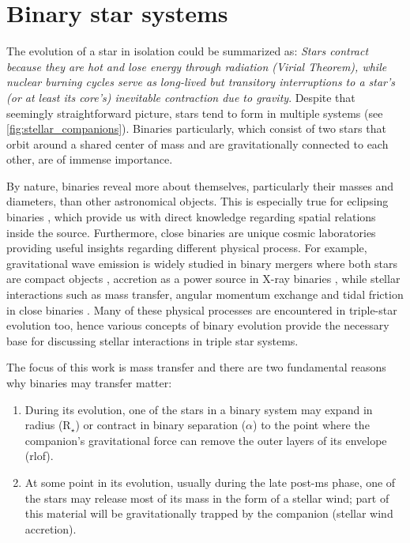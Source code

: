 \section{Binary star systems}\label{sec:binary_evolution}

The evolution of a star in isolation could be summarized as: {\it Stars contract because they are hot and lose energy through radiation (Virial Theorem), while nuclear burning cycles serve as long-lived but transitory interruptions to a star's (or at least its core's) inevitable contraction due to gravity}. Despite that seemingly straightforward picture, stars tend to form in multiple systems (see \cref{fig:stellar_companions}). Binaries particularly, which consist of two stars that orbit around a shared center of mass and are gravitationally connected to each other, are of immense importance.

By nature, binaries reveal more about themselves, particularly their masses and diameters, than other astronomical objects. This is especially true for eclipsing binaries \citep{prvsa2016physics}, which provide us with direct knowledge regarding spatial relations inside the source. Furthermore, close binaries are unique cosmic laboratories providing useful insights regarding different physical process. For example, gravitational wave emission is widely studied in binary mergers where both stars are compact objects \citep{cutler1994gravitational,abbott2017gw170608,abbott2019gwtc}, accretion as a power source in X-ray binaries \citep{lewin1997x,reig2011x}, while stellar interactions such as mass transfer, angular momentum exchange and tidal friction in close binaries \cite{lajoie2010mass,postnov2014evolution}. Many of these physical processes are encountered in triple-star evolution too, hence various concepts of binary evolution provide the necessary base for discussing stellar interactions in triple star systems.

The focus of this work is mass transfer and there are two fundamental reasons why binaries may transfer matter:
\begin{enumerate}
    \item During its evolution, one of the stars in a binary system may expand in radius (R$_{\star}$) or contract in binary separation (${\alpha}$) to the point where the companion's gravitational force can remove the outer layers of its envelope (\ac{rlof}).
    \item At some point in its evolution, usually during the late post-\ac{ms} phase, one of the stars may release most of its mass in the form of a stellar wind; part of this material will be gravitationally trapped by the companion (stellar wind accretion). 
\end{enumerate}

